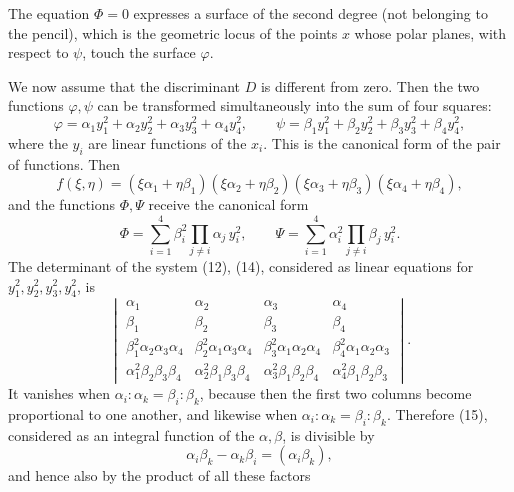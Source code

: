 \documentclass[11pt]{article}
\begin{document}
The equation $\Phi=0$ expresses a surface of the second degree (not belonging to the pencil), which is the geometric locus of the points $x$ whose polar planes, with respect to $\psi$, touch the surface $\varphi$.

We now assume that the discriminant $D$ is different from zero. Then the two functions $\varphi,\psi$ can be transformed simultaneously into the sum of four squares:
\begin{equation}
\varphi=\alpha_1y_1^2+\alpha_2y_2^2+\alpha_3y_3^2+\alpha_4y_4^2,\qquad
\psi=\beta_1y_1^2+\beta_2y_2^2+\beta_3y_3^2+\beta_4y_4^2,
\tag{12}
\end{equation}
where the $y_i$ are linear functions of the $x_i$. This is the canonical form of the pair of functions. Then
\begin{equation}
f(\xi,\eta)=(\xi\alpha_1+\eta\beta_1)(\xi\alpha_2+\eta\beta_2)(\xi\alpha_3+\eta\beta_3)(\xi\alpha_4+\eta\beta_4),
\tag{13}
\end{equation}
and the functions $\Phi,\Psi$ receive the canonical form
\begin{equation}
\Phi=\sum_{i=1}^4 \beta_i^2\!\!\prod_{j\ne i}\alpha_j\,y_i^2,\qquad
\Psi=\sum_{i=1}^4 \alpha_i^2\!\!\prod_{j\ne i}\beta_j\,y_i^2.
\tag{14}
\end{equation}
The determinant of the system (12), (14), considered as linear equations for $y_1^2,y_2^2,y_3^2,y_4^2$, is
\begin{equation}
\begin{vmatrix}
\alpha_1&\alpha_2&\alpha_3&\alpha_4\\
\beta_1&\beta_2&\beta_3&\beta_4\\
\beta_1^2\alpha_2\alpha_3\alpha_4&
\beta_2^2\alpha_1\alpha_3\alpha_4&
\beta_3^2\alpha_1\alpha_2\alpha_4&
\beta_4^2\alpha_1\alpha_2\alpha_3\\
\alpha_1^2\beta_2\beta_3\beta_4&
\alpha_2^2\beta_1\beta_3\beta_4&
\alpha_3^2\beta_1\beta_2\beta_4&
\alpha_4^2\beta_1\beta_2\beta_3
\end{vmatrix}.
\tag{15}
\end{equation}
It vanishes when $\alpha_i:\alpha_k=\beta_i:\beta_k$, because then the first two columns become proportional to one another, and likewise when $\alpha_i:\alpha_k=\beta_i:\beta_k$. Therefore (15), considered as an integral function of the $\alpha,\beta$, is divisible by
\begin{equation}
\alpha_i\beta_k-\alpha_k\beta_i=(\alpha_i\beta_k),
\tag{16}
\end{equation}
and hence also by the product of all these factors
\end{document}
